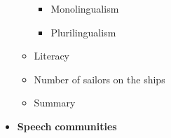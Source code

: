 \begin{itemize}
\begin{itemize}
\begin{itemize}
\item \begin{styleListParagraph}
Monolingualism
\end{styleListParagraph}
\item \begin{styleListParagraph}
Plurilingualism 
\end{styleListParagraph}
\end{itemize}
\item \begin{styleListParagraph}
Literacy 
\end{styleListParagraph}
\item \begin{styleListParagraph}
Number of sailors on the ships 
\end{styleListParagraph}
\item \begin{styleListParagraph}
Summary
\end{styleListParagraph}
\end{itemize}
\end{itemize}

\begin{itemize}
\item \begin{styleListParagraph}
\textbf{Speech} \textbf{communities} 
\end{styleListParagraph}
\end{itemize}

